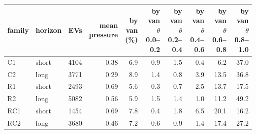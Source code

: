 \begin{tabular}{@{}llrrrrrrrr@{}}
\toprule
family & horizon & EVs & \shortstack[r]{mean\\pressure} & \shortstack[r]{by van\\(\%)} & \shortstack[r]{by van\\$\theta$ 0.0--0.2} & \shortstack[r]{by van\\$\theta$ 0.2--0.4} & \shortstack[r]{by van\\$\theta$ 0.4--0.6} & \shortstack[r]{by van\\$\theta$ 0.6--0.8} & \shortstack[r]{by van\\$\theta$ 0.8--1.0} \\
\midrule
C1 & short & 4104 & 0.38 & 6.9 & 0.9 & 1.5 & 0.4 & 6.2 & 37.0 \\
C2 & long & 3771 & 0.29 & 8.9 & 1.4 & 0.8 & 3.9 & 13.5 & 36.8 \\
R1 & short & 2493 & 0.69 & 5.6 & 0.3 & 0.7 & 2.5 & 13.7 & 17.5 \\
R2 & long & 5082 & 0.56 & 5.9 & 1.5 & 1.4 & 1.0 & 11.2 & 49.2 \\
RC1 & short & 1454 & 0.69 & 7.8 & 0.4 & 1.8 & 6.5 & 20.1 & 16.2 \\
RC2 & long & 3680 & 0.46 & 7.2 & 0.6 & 0.9 & 1.4 & 17.4 & 27.2 \\
\bottomrule
\end{tabular}
